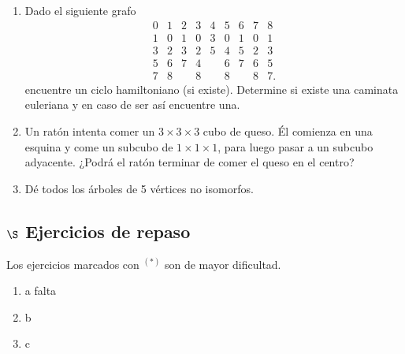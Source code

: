 \documentclass[a4paper,12pt,twoside,spanish,reqno]{amsbook}
\numberwithin{equation}{section}
\begin{document}
\begin{enumerate}
\begin{enumerate}
 (i) (4) y (2),\quad

 (ii) (5) y (6), \quad

 (iii) (5) y (1).



\item Halle las componentes conexas del grafo (7).
\end{enumerate} 


\item Dado el siguiente grafo
$$
\begin{matrix}
0&1&2&3&4&5&6&7&8\\ \hline
1&0&1&0&3&0&1&0&1\\
3&2&3&2&5&4&5&2&3\\
5&6&7&4&&6&7&6&5\\
7&8&&8&&8&&8&7.
\end{matrix}
$$
encuentre un ciclo hamiltoniano (si existe). Determine si existe una caminata euleriana y en caso de ser así encuentre una. 


\item Un ratón intenta comer un $3\times 3\times 3$ cubo de queso. Él comienza en una esquina y come un subcubo de $1\times 1\times 1$, para luego pasar a un subcubo adyacente. ¿Podrá el ratón terminar de comer el queso en el centro?

\item Dé todos los árboles de 5 vértices no isomorfos.
\end{enumerate}

\subsection*{$\S$ Ejercicios de repaso} Los ejercicios marcados con ${}^{(*)}$ son de mayor dificultad.

\begin{enumerate}[resume]
    \item a falta
    \item b
    \item c
\end{enumerate}
\end{document}
